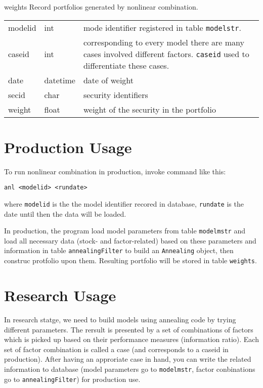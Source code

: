 \documentclass[10pt,oneside,a4paper]{article}
\begin{document}
\begin{argdesc}
  \item [weights] Record portfolios generated by nonlinear combination.
     
    \begin{tabular}{>{\ttfamily}l<{} l p{11cm}}
     modelid & int & mode identifier registered in table \texttt{modelstr}.\\
     caseid  & int & corresponding to every model there are many cases involved different factors.
              \texttt{caseid} used to differentiate these cases. \\
     date    & datetime & date of weight \\
     secid   & char & security identifiers \\
     weight  & float & weight of the security in the portfolio \\
    \end{tabular}

\end{argdesc}

\section{Production Usage}

To run nonlinear combination in production, invoke command like this:

\begin{lstlisting}[numbers=none]
    anl <modelid> <rundate>
\end{lstlisting}
where \texttt{modelid} is the the model identifier recored in database,
\texttt{rundate} is the date until then the data will be loaded.

In production, the program load model parameters from table \texttt{modelmstr}
and load all necessary data (stock- and factor-related) based on these parameters and 
information in table \texttt{annealingFilter}
to build an \texttt{Annealing} object, then construc protfolio upon them. 
Resulting portfolio will be stored in table \texttt{weights}.

\section{Research Usage}

In research statge, we need to build models using annealing code by trying different parameters.
The rersult is presented by a set of combinations of factors which is picked up based on their
performance measures (information ratio).
Each set of factor combination is called a case (and corresponds to a caseid in production).
After having an approriate case in hand, you can write the related information to
database (model parameters go to \texttt{modelmstr}, factor conbinations go to \texttt{annealingFilter})
for production use.
\end{document}
